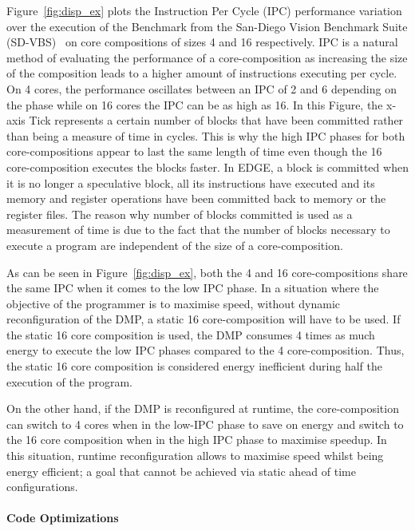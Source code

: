 Figure~\ref{fig:disp_ex} plots the Instruction Per Cycle (IPC) performance variation over the execution of the  Benchmark from the San-Diego Vision Benchmark Suite (SD-VBS)~\cite{sdvbs} on core compositions of sizes 4 and 16 respectively.
IPC is a natural method of evaluating the performance of a core-composition as increasing the size of the composition leads to a higher amount of instructions executing per cycle.
On 4 cores, the performance oscillates between an IPC of 2 and 6 depending on the phase while on 16 cores the IPC can be as high as 16.
In this Figure, the x-axis Tick represents a certain number of blocks that have been committed rather than being a measure of time in cycles.
This is why the high IPC phases for both core-compositions appear to last the same length of time even though the 16 core-composition executes the blocks faster.
In EDGE, a block is committed when it is no longer a speculative block, all its instructions have executed and its memory and register operations have been committed back to memory or the register files.
The reason why number of blocks committed is used as a measurement of time is due to the fact that the number of blocks necessary to execute a program are independent of the size of a core-composition.

As can be seen in Figure~\ref{fig:disp_ex}, both the 4 and 16 core-compositions share the same IPC when it comes to the low IPC phase.
In a situation where the objective of the programmer is to maximise speed, without dynamic reconfiguration of the DMP, a static 16 core-composition will have to be used.
If the static 16 core composition is used, the DMP consumes 4 times as much energy to execute the low IPC phases compared to the 4 core-composition.
Thus, the static 16 core composition is considered energy inefficient during half the execution of the program.

On the other hand, if the DMP is reconfigured at runtime, the core-composition can switch to 4 cores when in the low-IPC phase to save on energy and switch to the 16 core composition when in the high IPC phase to maximise speedup.
In this situation, runtime reconfiguration allows to maximise speed whilst being energy efficient; a goal that cannot be achieved via static ahead of time configurations.

\paragraph{Code Optimizations}

